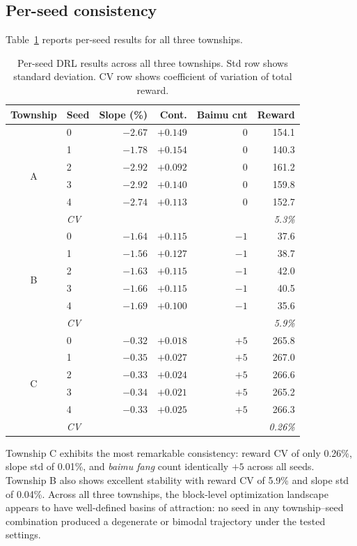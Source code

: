 \documentclass[preprint,12pt]{elsarticle}
\begin{document}
\subsection{Per-seed consistency}
\label{sec:consistency}

Table~\ref{tab:per_seed} reports per-seed results for all three townships.

\begin{table}[htbp]
\centering
\caption{Per-seed DRL results across all three townships. Std row shows standard deviation. CV row shows coefficient of variation of total reward.}
\label{tab:per_seed}
\begin{tabular}{clrrrr}
\toprule
Township & Seed & Slope (\%) & Cont. & Baimu cnt & Reward \\
\midrule
\multirow{6}{*}{A}
 & 0 & $-2.67$ & $+0.149$ & 0 & 154.1 \\
 & 1 & $-1.78$ & $+0.154$ & 0 & 140.3 \\
 & 2 & $-2.92$ & $+0.092$ & 0 & 161.2 \\
 & 3 & $-2.92$ & $+0.140$ & 0 & 159.8 \\
 & 4 & $-2.74$ & $+0.113$ & 0 & 152.7 \\
 & \textit{CV} & \multicolumn{4}{r}{\textit{5.3\%}} \\
\midrule
\multirow{6}{*}{B}
 & 0 & $-1.64$ & $+0.115$ & $-1$ & 37.6 \\
 & 1 & $-1.56$ & $+0.127$ & $-1$ & 38.7 \\
 & 2 & $-1.63$ & $+0.115$ & $-1$ & 42.0 \\
 & 3 & $-1.66$ & $+0.115$ & $-1$ & 40.5 \\
 & 4 & $-1.69$ & $+0.100$ & $-1$ & 35.6 \\
 & \textit{CV} & \multicolumn{4}{r}{\textit{5.9\%}} \\
\midrule
\multirow{6}{*}{C}
 & 0 & $-0.32$ & $+0.018$ & $+5$ & 265.8 \\
 & 1 & $-0.35$ & $+0.027$ & $+5$ & 267.0 \\
 & 2 & $-0.33$ & $+0.024$ & $+5$ & 266.6 \\
 & 3 & $-0.34$ & $+0.021$ & $+5$ & 265.2 \\
 & 4 & $-0.33$ & $+0.025$ & $+5$ & 266.3 \\
 & \textit{CV} & \multicolumn{4}{r}{\textit{0.26\%}} \\
\bottomrule
\end{tabular}
\end{table}

Township C exhibits the most remarkable consistency: reward CV of only 0.26\%, slope std of 0.01\%, and \textit{baimu fang} count identically $+5$ across all seeds. Township B also shows excellent stability with reward CV of 5.9\% and slope std of 0.04\%. Across all three townships, the block-level optimization landscape appears to have well-defined basins of attraction: no seed in any township--seed combination produced a degenerate or bimodal trajectory under the tested settings.
\end{document}
